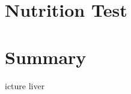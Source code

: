 \documentclass[../main.tex]{subfiles}
\begin{document}


\chapter{Nutrition Test}



\chapter{Summary}

icture liver \cite{LiverPic} 






\end{document}
